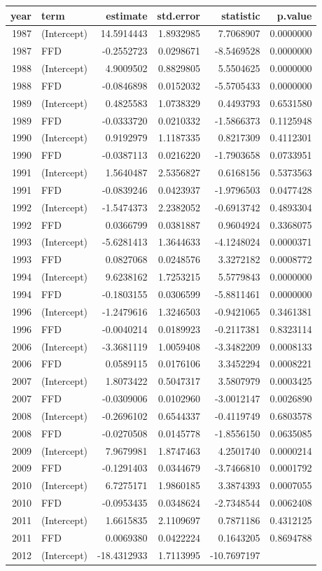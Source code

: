 \documentclass[
]{article}
\begin{document}
\begin{longtable}[]{@{}rlrrrr@{}}
\toprule
year & term & estimate & std.error & statistic & p.value\tabularnewline
\midrule
\endhead
1987 & (Intercept) & 14.5914443 & 1.8932985 & 7.7068907 &
0.0000000\tabularnewline
1987 & FFD & -0.2552723 & 0.0298671 & -8.5469528 &
0.0000000\tabularnewline
1988 & (Intercept) & 4.9009502 & 0.8829805 & 5.5504625 &
0.0000000\tabularnewline
1988 & FFD & -0.0846898 & 0.0152032 & -5.5705433 &
0.0000000\tabularnewline
1989 & (Intercept) & 0.4825583 & 1.0738329 & 0.4493793 &
0.6531580\tabularnewline
1989 & FFD & -0.0333720 & 0.0210332 & -1.5866373 &
0.1125948\tabularnewline
1990 & (Intercept) & 0.9192979 & 1.1187335 & 0.8217309 &
0.4112301\tabularnewline
1990 & FFD & -0.0387113 & 0.0216220 & -1.7903658 &
0.0733951\tabularnewline
1991 & (Intercept) & 1.5640487 & 2.5356827 & 0.6168156 &
0.5373563\tabularnewline
1991 & FFD & -0.0839246 & 0.0423937 & -1.9796503 &
0.0477428\tabularnewline
1992 & (Intercept) & -1.5474373 & 2.2382052 & -0.6913742 &
0.4893304\tabularnewline
1992 & FFD & 0.0366799 & 0.0381887 & 0.9604924 &
0.3368075\tabularnewline
1993 & (Intercept) & -5.6281413 & 1.3644633 & -4.1248024 &
0.0000371\tabularnewline
1993 & FFD & 0.0827068 & 0.0248576 & 3.3272182 &
0.0008772\tabularnewline
1994 & (Intercept) & 9.6238162 & 1.7253215 & 5.5779843 &
0.0000000\tabularnewline
1994 & FFD & -0.1803155 & 0.0306599 & -5.8811461 &
0.0000000\tabularnewline
1996 & (Intercept) & -1.2479616 & 1.3246503 & -0.9421065 &
0.3461381\tabularnewline
1996 & FFD & -0.0040214 & 0.0189923 & -0.2117381 &
0.8323114\tabularnewline
2006 & (Intercept) & -3.3681119 & 1.0059408 & -3.3482209 &
0.0008133\tabularnewline
2006 & FFD & 0.0589115 & 0.0176106 & 3.3452294 &
0.0008221\tabularnewline
2007 & (Intercept) & 1.8073422 & 0.5047317 & 3.5807979 &
0.0003425\tabularnewline
2007 & FFD & -0.0309006 & 0.0102960 & -3.0012147 &
0.0026890\tabularnewline
2008 & (Intercept) & -0.2696102 & 0.6544337 & -0.4119749 &
0.6803578\tabularnewline
2008 & FFD & -0.0270508 & 0.0145778 & -1.8556150 &
0.0635085\tabularnewline
2009 & (Intercept) & 7.9679981 & 1.8747463 & 4.2501740 &
0.0000214\tabularnewline
2009 & FFD & -0.1291403 & 0.0344679 & -3.7466810 &
0.0001792\tabularnewline
2010 & (Intercept) & 6.7275171 & 1.9860185 & 3.3874393 &
0.0007055\tabularnewline
2010 & FFD & -0.0953435 & 0.0348624 & -2.7348544 &
0.0062408\tabularnewline
2011 & (Intercept) & 1.6615835 & 2.1109697 & 0.7871186 &
0.4312125\tabularnewline
2011 & FFD & 0.0069380 & 0.0422224 & 0.1643205 &
0.8694788\tabularnewline
2012 & (Intercept) & -18.4312933 & 1.7113995 & -10.7697197 &

\end{longtable}
\end{document}
